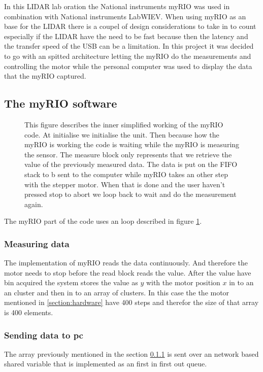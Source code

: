 In this LIDAR lab oration the National instruments myRIO was used in combination with National instruments LabWIEV. 
When using myRIO as an base for the LIDAR there is a coupel of design considerations to take in to count especially if the LIDAR have the need to be fast because then the latency and the transfer speed of the USB can be a limitation. 
In this project it was decided to go with an spitted architecture letting the myRIO do the measurements and controlling the motor while the personal computer was used to display the data that the myRIO captured.

\subsection{The myRIO software}\label{subsection:myRIO}
\begin{figure}[ht]
    
  \caption{This figure describes the inner simplified working of the myRIO code.
  At initialise we initialise the unit. Then because how the myRIO is working the code is waiting while the myRIO is measuring the sensor. The measure block only represents that we retrieve the value of the previously measured data. The data is put on the FIFO stack to b sent to the computer while myRIO takes an other step with the stepper motor. When that is done and the user haven't pressed stop to abort we loop back to wait and do the measurement again.}
  \label{fig:myRIO-loop}
\end{figure}
The myRIO part of the code uses an loop described in figure \ref{fig:myRIO-loop}.

\subsubsection{Measuring data}\label{subsubsection:mesure}
The implementation of myRIO reads the data continuously.
And therefore the motor needs to stop before the read block reads the value.
After the value have bin acquired the system stores the value as $y$ with the motor position $x$ in to an an cluster and then in to an array of clusters. In this case the the motor mentioned in \ref{section:hardware} have 400 steps and therefor the size of that array is 400 elements.

\subsubsection{Sending data to pc}\label{subsubsection:sendData}
The array previously mentioned in the section \ref{subsubsection:mesure} is sent over an network based shared variable that is implemented as an first in first out queue\cite{myRIO-Shared}. 


